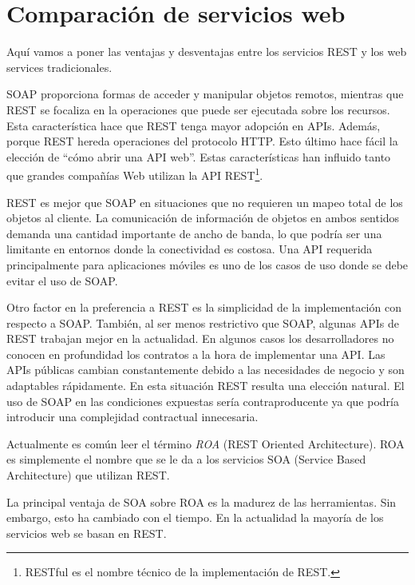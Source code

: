 \documentclass[conference]{IEEEtran}
\begin{document}
\section{Comparación de servicios web}
\label{sec:comparacion}

Aquí vamos a poner las ventajas y desventajas entre los servicios REST
y los web services tradicionales.


SOAP proporciona formas de acceder y manipular objetos remotos, mientras que REST se focaliza en la operaciones que puede ser
ejecutada sobre los recursos. Esta característica hace que REST tenga
mayor adopción en APIs. Además, porque REST hereda operaciones del
protocolo HTTP. Esto último hace fácil la elección de ``cómo abrir una
API web''. Estas características han influido tanto que grandes
compañías Web utilizan la API REST\footnote{RESTful es el nombre
  técnico de la implementación de REST.}.

REST es mejor que SOAP en situaciones que no requieren un mapeo total
de los objetos al cliente. La comunicación de información de objetos
en ambos sentidos demanda una cantidad importante de ancho de banda,
lo que podría ser una limitante en entornos donde la conectividad es
costosa. Una API requerida principalmente para aplicaciones móviles es
uno de los casos de uso donde se debe evitar el uso de SOAP.

Otro factor en la preferencia a REST es la simplicidad de la
implementación con respecto a SOAP. También, al ser menos restrictivo
que SOAP, algunas APIs de REST trabajan mejor en la actualidad. En
algunos casos los desarrolladores no conocen en profundidad los
contratos a la hora de implementar una API. Las APIs públicas cambian
constantemente debido a las necesidades de negocio y son adaptables
rápidamente. En esta situación REST resulta una elección
natural. El uso de SOAP en las condiciones expuestas sería
contraproducente ya que podría introducir una complejidad contractual
innecesaria. 

Actualmente es común leer el término \emph{ROA} (REST Oriented
Architecture). ROA es simplemente el nombre que se le da a los
servicios SOA (Service Based Architecture) que utilizan REST.

La principal ventaja de SOA sobre ROA es la madurez de las
herramientas. Sin embargo, esto ha cambiado con el tiempo. En la
actualidad la mayoría de los servicios web se basan en REST.
\end{document}
